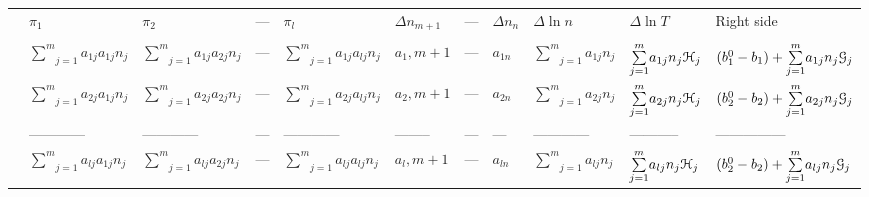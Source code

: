 


%


\begin{landscape}

\begin{tabular}{|l|llll|lll|l|l|l|}

\hline

 & $\pi_1$ & $\pi_2$ & --- & $\pi_l$ & $\Delta n_{m+1}$ & --- &
 $\Delta n_n$ & $\Delta \ln{n}$ & $\Delta \ln{T}$ & Right side \\

 &  & & & & & & &  & & \\

\hline

 & $ \underset{j=1}{\overset{m}{\sum}}{a_{1j}a_{1j}n_j} $ &
 $ \underset{j=1}{\overset{m}{\sum}}{a_{1j}a_{2j}n_j} $ & --- &
 $ \underset{j=1}{\overset{m}{\sum}}{a_{1j}a_{lj}n_j} $ & $a_1,m+1$ &
 --- & $a_{1n}$ & 
 $ \underset{j=1}{\overset{m}{\sum}}{a_{1j}n_j} $ &
 $ \underset{j=1}{\overset{m}{\sum}}{a_{1j}n_j\EuScript{H}_j} $ & $ (b_1^0 -
 b_1)+\underset{j=1}{\overset{m}{\sum}}{a_{1j}n_j\EuScript{G}_j} $ \\


& $ \underset{j=1}{\overset{m}{\sum}}{a_{2j}a_{1j}n_j} $ &
 $ \underset{j=1}{\overset{m}{\sum}}{a_{2j}a_{2j}n_j} $ & --- &
 $ \underset{j=1}{\overset{m}{\sum}}{a_{2j}a_{lj}n_j} $ & $a_2,m+1$ &
 --- & $a_{2n}$ & 
 $ \underset{j=1}{\overset{m}{\sum}}{a_{2j}n_j} $ &
 $ \underset{j=1}{\overset{m}{\sum}}{a_{2j}n_j\EuScript{H}_j} $ & $ (b_2^0 -
 b_2)+\underset{j=1}{\overset{m}{\sum}}{a_{2j}n_j\EuScript{G}_j} $ \\


 & ------------ & ------------ & --- & ------------ & -------- & --- &
 --- & ------------ & ----------- & --------------- \\


& $ \underset{j=1}{\overset{m}{\sum}}{a_{lj}a_{1j}n_j} $ &
 $ \underset{j=1}{\overset{m}{\sum}}{a_{lj}a_{2j}n_j} $ & --- &
 $ \underset{j=1}{\overset{m}{\sum}}{a_{lj}a_{lj}n_j} $ & $a_l,m+1$ &
 --- & $a_{ln}$ & 
 $ \underset{j=1}{\overset{m}{\sum}}{a_{lj}n_j} $ &
 $ \underset{j=1}{\overset{m}{\sum}}{a_{lj}n_j\EuScript{H}_j} $ & $ (b_2^0 -
 b_2)+\underset{j=1}{\overset{m}{\sum}}{a_{lj}n_j\EuScript{G}_j} $ \\


\end{tabular}
\end{landscape}
